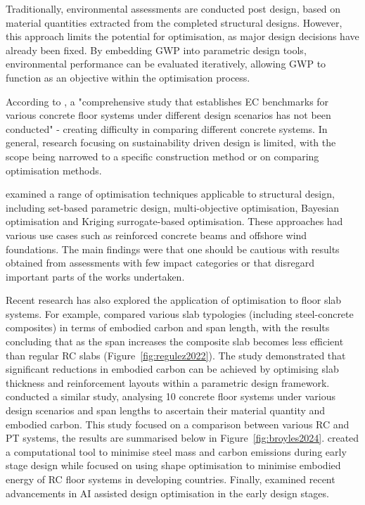Traditionally, environmental assessments are conducted post design, based on material quantities extracted from the completed structural designs. However, this approach limits the potential for optimisation, as major design decisions have already been fixed. By embedding GWP into parametric design tools, environmental performance can be evaluated iteratively, allowing GWP to function as an objective within the optimisation process.

According to \cite{RefWorks:broyles2024equations}, a "comprehensive study that establishes EC benchmarks for various concrete floor systems under different design scenarios has not been conducted" - creating difficulty in comparing different concrete systems. In general, research focusing on sustainability driven design is limited, with the scope being narrowed to a specific construction method or on comparing optimisation methods.

\cite{RefWorks:mathern2021addressing} examined a range of optimisation techniques applicable to structural design, including set-based parametric design, multi-objective optimisation, Bayesian optimisation and Kriging surrogate-based optimisation. These approaches had various use cases such as reinforced concrete beams and offshore wind foundations. The main findings were that one should be cautious with results obtained from assessments with few impact categories or that disregard important parts of the works undertaken. 

Recent research has also explored the application of optimisation to floor slab systems. For example, \cite{RefWorks:regulez2022sustainability} compared various slab typologies (including steel-concrete composites) in terms of embodied carbon and span length, with the results concluding that as the span increases the composite slab becomes less efficient than regular RC slabs (Figure~\ref{fig:regulez2022}). The study demonstrated that significant reductions in embodied carbon can be achieved by optimising slab thickness and reinforcement layouts within a parametric design framework. \cite{RefWorks:broyles2024equations} conducted a similar study, analysing 10 concrete floor systems under various design scenarios and span lengths to ascertain their material quantity and embodied carbon. This study focused on a comparison between various RC and PT systems, the results are summarised below in Figure~\ref{fig:broyles2024}. \cite{RefWorks:damico2018accuracy} created a computational tool to minimise steel mass and carbon emissions during early stage design while \cite{RefWorks:ismail2021minimizing} focused on using shape optimisation to minimise embodied energy of RC floor systems in developing countries. Finally, \cite{RefWorks:manmatharasan2025aidriven} examined recent advancements in AI assisted design optimisation in the early design stages.

